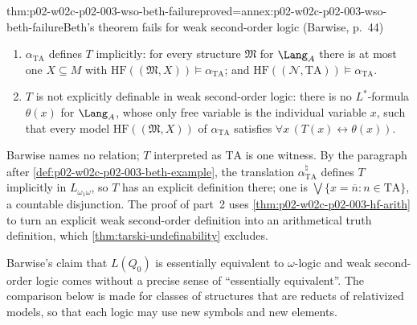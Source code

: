 \begin{hbtheorem}{thm:p02-w02c-p02-003-wso-beth-failure}{proved=annex:p02-w02c-p02-003-wso-beth-failure}{Beth's theorem fails for weak second-order logic (Barwise, p.~44)}
\begin{enumerate}
\item \(\alpha_{\mathrm{TA}}\) defines \(T\) implicitly: for every structure
      \(\mathfrak M\) for \(\Lang_A\) there is at most one \(X\subseteq M\)
      with \(\mathrm{HF}((\mathfrak M,X))\models\alpha_{\mathrm{TA}}\); and
      \(\mathrm{HF}((\mathcal N,\mathrm{TA}))\models\alpha_{\mathrm{TA}}\).
\item \(T\) is not explicitly definable in weak second-order logic: there is
      no \(L^{*}\)-formula \(\theta(x)\) for \(\Lang_A\), whose only free
      variable is the individual variable \(x\), such that every model
      \(\mathrm{HF}((\mathfrak M,X))\) of \(\alpha_{\mathrm{TA}}\) satisfies
      \(\forall x\,(T(x)\leftrightarrow\theta(x))\).
\end{enumerate}
\end{hbtheorem}

Barwise names no relation; \(T\) interpreted as \(\mathrm{TA}\) is one
witness.  By the paragraph after \cref{def:p02-w02c-p02-003-beth-example},
the translation \(\alpha_{\mathrm{TA}}^{\natural}\) defines \(T\)
implicitly in \(L_{\omega_1\omega}\), so \(T\) has an explicit definition
there; one is \(\bigvee\{x=\overline n:n\in\mathrm{TA}\}\), a countable
disjunction.  The proof of part~2 uses
\cref{thm:p02-w02c-p02-003-hf-arith} to turn an explicit weak second-order
definition into an arithmetical truth definition, which
\cref{thm:tarski-undefinability} excludes.

Barwise's claim that \(L(Q_0)\) is essentially equivalent to
\(\omega\)-logic and weak second-order logic
\cite[ch.~A.1, \S5, p.~44]{Barwise1977FirstOrder} comes without a precise
sense of ``essentially equivalent''.  The comparison below is made for
classes of structures that are reducts of relativized models, so that each
logic may use new symbols and new elements.

